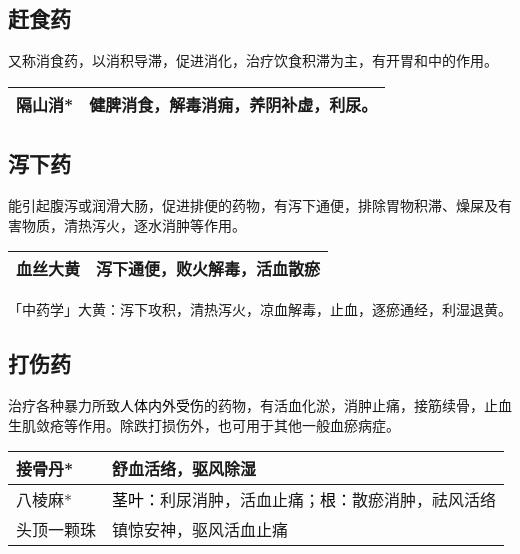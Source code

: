 \documentclass[cn,hazy,black,12pt,normal,founder]{elegantnote}
\newcommand{\redt}[1]{\textcolor{black}{{}#1}}      %
\begin{document}
\subsection{赶食药}

又称消食药，以消积导滞，促进消化，治疗饮食积滞为主，有开胃和中的作用。

\begin{table}[H]
  \begin{tabular}{|l|l|}
  \hline
  隔山消* & 健脾消食，解毒消痈，养阴补虚，利尿。 \\ \hline
  \end{tabular}
\end{table}

\subsection{泻下药}

能引起腹泻或润滑大肠，促进排便的药物，有泻下通便，排除胃物积滞、燥屎及有害物质，清热泻火，逐水消肿等作用。


\begin{table}[H]
  \begin{tabular}{|l|l|}
  \hline
  血丝大黄 & 泻下通便，败火解毒，活血散瘀  \\ \hline
  \end{tabular}
\end{table}

\begin{note}
「中药学」大黄：泻下攻积，清热泻火，凉血解毒，止血，逐瘀通经，利湿退黄。
\end{note}

\subsection{打伤药}

治疗各种暴力所致\redt{人体内外受伤}的药物，有活血化淤，消肿止痛，接筋续骨，止血生肌敛疮等作用。除跌打损伤外，也可用于其他一般血瘀病症。

\begin{table}[H]
  \begin{tabular}{|l|l|}
  \hline
  接骨丹* & 舒血活络，驱风除湿 \\ \hline
  八棱麻* & \redt{茎叶：}利尿消肿，活血止痛；\redt{根：}散瘀消肿，祛风活络 \\ \hline
  头顶一颗珠 & 镇惊安神，驱风活血止痛 \\ \hline
  \end{tabular}
\end{table}
\end{document}
